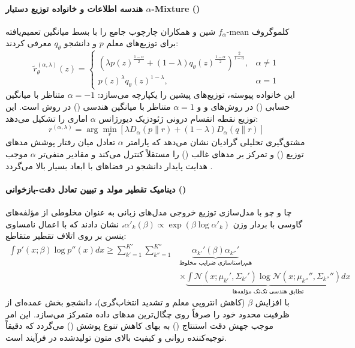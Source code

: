\paragraph*{هندسه اطلاعات و خانواده توزیع دستیار $\alpha$-Mixture ()}
شین و همکاران \cite{shin2026amid} چارچوب جامع  را با بسط میانگین تعمیم‌یافته $f_\alpha$-mean کلموگروف برای توزیع‌های معلم $p$ و دانشجو $q_\theta$ معرفی کردند:
\begin{equation}
    \tilde{r}_\theta^{(\alpha, \lambda)}(z) = \begin{cases} 
        \left( \lambda p(z)^{\frac{1-\alpha}{2}} + (1-\lambda) q_\theta(z)^{\frac{1-\alpha}{2}} \right)^{\frac{2}{1-\alpha}}, & \alpha \neq 1 \\ 
        p(z)^\lambda q_\theta(z)^{1-\lambda}, & \alpha = 1 
    \end{cases}
\end{equation}
این خانواده پیوسته، توزیع‌های پیشین را یکپارچه می‌سازد: $\alpha = -1$ متناظر با میانگین حسابی () در روش‌های  و  و $\alpha = 1$ متناظر با میانگین هندسی () در روش  است. این توزیع نقطه انقسام درونی ژئودزیک دیورژانس $\alpha$ اماری را تشکیل می‌دهد:
\begin{equation}
    r^{(\alpha, \lambda)} = \arg\min_r \left[ \lambda D_\alpha(p \parallel r) + (1-\lambda) D_\alpha(q \parallel r) \right]
\end{equation}
مشتق‌گیری تحلیلی گرادیان نشان می‌دهد که پارامتر $\alpha$ تعادل میان رفتار پوشش مدهای توزیع () و تمرکز بر مدهای غالب () را مستقلاً کنترل می‌کند و مقادیر منفی‌تر $\alpha$ موجب هدایت پایدار دانشجو در فضاهای با ابعاد بسیار بالا می‌گردد \cite{shin2026amid}.

\paragraph*{دینامیک تقطیر مولد و تبیین تعادل دقت-بازخوانی ()}
چا و چو \cite{cha2025why} با مدل‌سازی توزیع خروجی مدل‌های زبانی به عنوان مخلوطی از مؤلفه‌های گاوسی با بردار وزن $\alpha'_k(\beta) \propto \exp(\beta \log \alpha'_k)$، نشان دادند که با اعمال نامساوی ینسن بر روی اتلاف تقطیر متقاطع:
\begin{equation}
\begin{aligned}
    \int p'(x; \beta) \log p''(x) dx \ge \sum_{k'=1}^{K'} \sum_{k''=1}^{K''} &\underbrace{\alpha_{k'}'(\beta) \alpha_{k''}'}_{\text{هم‌راستاسازی ضرایب مخلوط}} \\
    &\times \underbrace{\int \mathcal{N}(x; \mu_{k'}', \Sigma_{k'}') \log \mathcal{N}(x; \mu_{k''}'', \Sigma_{k''}'') dx}_{\text{تطابق هندسی تک‌تک مؤلفه‌ها}}
\end{aligned}
\end{equation}
با افزایش $\beta$ (کاهش انتروپی معلم و تشدید انتخاب‌گری)، دانشجو بخش عمده‌ای از ظرفیت محدود خود را صرفاً روی چگال‌ترین مدهای داده متمرکز می‌سازد. این امر موجب جهش دقت استنتاج () به بهای کاهش تنوع پوشش () می‌گردد که دقیقاً توجیه‌کننده روانی و کیفیت بالای متون تولیدشده در فرآیند  است.

